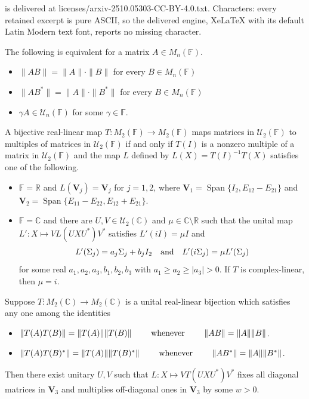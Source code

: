 \documentclass[10pt,a4paper]{amsart}
\def\IC{{\mathbb C}}
\def\IF{{\mathbb F}}
\def\IR{{\mathbb R}}
\def\bV{{\mathbf V}}
\def\span{{\mathop{\mathrm{Span}}\nolimits}}
\begin{document}
is delivered at licenses/arxiv-2510.05303-CC-BY-4.0.txt. Characters: every retained excerpt is pure ASCII, so the delivered engine, XeLaTeX with its default Latin Modern text font, reports no missing character.
 \begin{lemma}\label{lam1} The following is equivalent for a matrix $A\in M_n(\IF)$.
 \begin{itemize}
  \item[{\rm (i)}] $\|AB\|=\|A\|\cdot\|B\|$ for every $B\in M_n(\IF)$
   \item[{\rm (ii)}] $\|AB^\ast\|=\|A\|\cdot\|B^\ast\|$ for every $B\in M_n(\IF)$
   \item[{\rm (iii)}] $\gamma A\in {\mathcal U}_n(\IF)$ for some $\gamma \in \IF$.
 \end{itemize}
 \end{lemma}

\begin{theorem}\label{P:unitary}
A bijective real-linear map $T\colon  M_2(\IF) \rightarrow M_2(\IF)$
maps matrices in ${\mathcal U}_2(\IF)$ to multiples of matrices in ${\mathcal U}_2(\IF)$ if and only if $T(I)$ is a nonzero multiple of a  matrix  in ${\mathcal U}_2(\IF)$ and the map $L$ defined by $L(X) = T(I)^{-1} T(X)$ satisfies one of the following.
\begin{itemize}
\item[{\rm (i)}] $\IF = \IR$ and $L(\bV_j) = \bV_j$ for $j = 1,2$, where
$\bV_1 = \span\{I_2, E_{12}-E_{21}\}$ and $\bV_2 = \span\{E_{11}-E_{22}, E_{12} + E_{21}\}$.
\item[{\rm (ii)}] $\IF=\IC$ and there are $U,V\in {\mathcal U}_2(\IC)$ and $\mu\in\IC\setminus\IR$ such that the unital map $L'\colon X \mapsto
 VL(UXU^\ast)V^\ast$ satisfies $L'(i I)=\mu I$ and
               $$L'(\Sigma_j) = a_j \Sigma_j +  b_j I_2\quad \hbox{and}\quad L'(i\Sigma_j)=\mu L'(\Sigma_j)$$     for some
real $a_1, a_2, a_3, b_1, b_2, b_3$ with  $a_1\ge a_2\ge| a_3|>0$. If $T$ is complex-linear, then $\mu=i$.
\end{itemize}
\end{theorem}

\begin{lemma}\label{lem:aux2-by-2-reallinear}
 	Suppose $T\colon M_2(\IC) \rightarrow M_2(\IC)$ is a  unital real-linear bijection which satisfies any one among the identities
    \begin{itemize}
     \item[{\rm (i)}] $\|T(A)T(B)\| = \|T(A)\| \|T(B)\| \qquad \hbox{ whenever } \qquad \|AB\| = \|A\| \|B\|$.
     \item[{\rm (ii)}] $\|T(A)T(B)^\ast\| = \|T(A)\| \|T(B)^\ast\| \qquad \hbox{ whenever } \qquad \|AB^\ast\| = \|A\| \|B^\ast\|$.
      \end{itemize}
	Then there exist  unitary $U,V$ such that $L\colon X\mapsto  V T(U XU^\ast)V^\ast$ fixes all diagonal matrices in $\bV_3$ and multiplies off-diagonal ones in $\bV_3$  by some $w>0$.
\end{lemma}
\end{document}
